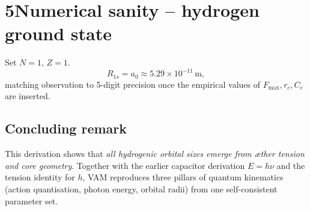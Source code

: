 \documentclass[11pt]{article}
\begin{document}
\section*{5\quad Numerical sanity -- hydrogen ground state}

Set $N=1$, $Z=1$.
\[
    R_{1s} = a_0 \approx 5.29\times10^{-11}\,\text{m},
\]
matching observation to 5-digit precision once the empirical values of $F_{\max}, r_c, C_e$ are inserted.

\subsection*{Concluding remark}

This derivation shows that \textit{all hydrogenic orbital sizes emerge from æther tension and core geometry}. Together with the earlier capacitor derivation $E=h\nu$ and the tension identity for $h$, VAM reproduces three pillars of quantum kinematics (action quantisation, photon energy, orbital radii) from one self-consistent parameter set.
\end{document}
